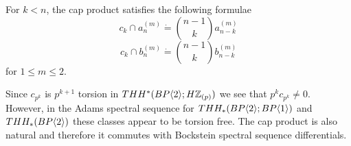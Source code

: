 \begin{cor}
For $k < n$, the cap product satisfies the following formulae
\[c_k\cap a_n^{(m)} \dot{=} \binom{n-1}{k} a_{n-k}^{(m)}\]
\[c_k\cap b_n^{(m)} \dot{=} \binom{n-1}{k} b_{n-k}^{(m)}\]
for $1\le m \le 2$. 
\end{cor}
Since $c_{p^k}$ is $p^{k+1}$ torsion in $THH^*(BP\langle 2 \rangle;H\mathbb{Z}_{(p)})$ we see that $p^kc_{p^k}\ne 0$. However, in the Adams spectral sequence for $THH_*(BP\langle 2 \rangle;BP\langle 1 \rangle)$ and $THH_*(BP\langle 2 \rangle)$ these classes appear to be torsion free. The cap product is also natural and therefore it commutes with Bockstein spectral sequence differentials.
